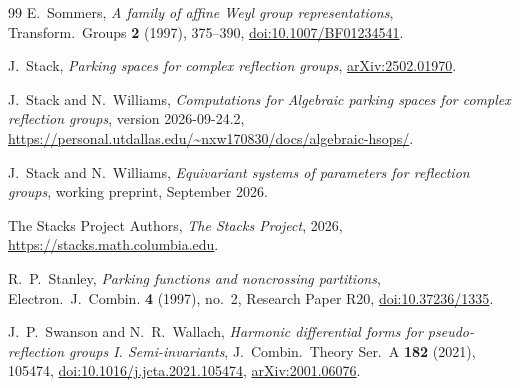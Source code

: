 \documentclass[10pt,a4paper]{amsart}
\theoremstyle{definition}
\begin{document}
\begin{thebibliography}{99}
E.~Sommers, \emph{A family of affine Weyl group representations},
Transform.~Groups \textbf{2} (1997), 375--390,
\href{https://doi.org/10.1007/BF01234541}{doi:10.1007/BF01234541}.

J.~Stack, \emph{Parking spaces for complex reflection groups},
\href{https://arxiv.org/abs/2502.01970}{arXiv:2502.01970}.

J.~Stack and N.~Williams,
\emph{Computations for Algebraic parking spaces for complex reflection groups},
version 2026-09-24.2,
\url{https://personal.utdallas.edu/~nxw170830/docs/algebraic-hsops/}.

J.~Stack and N.~Williams,
\emph{Equivariant systems of parameters for reflection groups},
working preprint, September 2026.

The Stacks Project Authors,
\emph{The Stacks Project}, 2026,
\url{https://stacks.math.columbia.edu}.

R.~P.~Stanley,
\emph{Parking functions and noncrossing partitions},
Electron.~J.~Combin. \textbf{4} (1997), no.~2, Research Paper R20,
\href{https://doi.org/10.37236/1335}{doi:10.37236/1335}.

J.~P.~Swanson and N.~R.~Wallach,
\emph{Harmonic differential forms for pseudo-reflection groups I.
Semi-invariants},
J.~Combin.~Theory Ser.~A \textbf{182} (2021), 105474,
\href{https://doi.org/10.1016/j.jcta.2021.105474}{doi:10.1016/j.jcta.2021.105474},
\href{https://arxiv.org/abs/2001.06076}{arXiv:2001.06076}.

\end{thebibliography}
\end{document}
